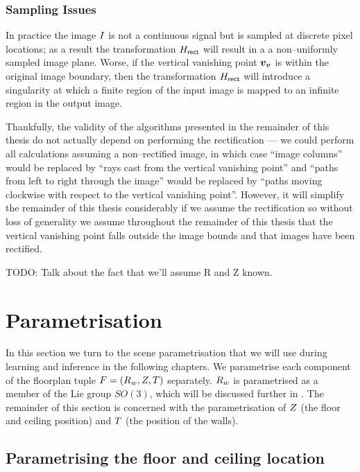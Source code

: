 \subsubsection{Sampling Issues}

In practice the image $\Image$ is not a continuous signal but is
sampled at discrete pixel locations; as a result the transformation
$\Rectifier$ will result in a a non--uniformly sampled image
plane. Worse, if the vertical vanishing point $\vvpt$ is within the
original image boundary, then the transformation $\Rectifier$ will
introduce a singularity at which a finite region of the input image is
mapped to an infinite region in the output image.

Thankfully, the validity of the algorithms presented in the remainder
of this thesis do not actually depend on performing the rectification
 --- we could perform all calculations assuming
a non--rectified image, in which case ``image columns'' would be
replaced by ``rays cast from the vertical vanishing point'' and
``paths from left to right through the image'' would be replaced by
``paths moving clockwise with respect to the vertical vanishing
point''. However, it will simplify the remainder of this thesis
considerably if we assume the rectification  so
without loss of generality we assume throughout the remainder of this
thesis that the vertical vanishing point falls outside the image
bounds and that images have been rectified.

TODO: Talk about the fact that we'll assume R and Z known.

\section{Parametrisation}

In this section we turn to the scene parametrisation that we will use
during learning and inference in the following chapters. We
parametrise each component of the floorplan tuple
$\Floorplan=(\SceneR,\Zs,\Polyline)$ separately. $\SceneR$ is
parametrised as a member of the Lie group $SO(3)$, which will be
discussed further in . The remainder of this
section is concerned with the parametrisation of $\Zs$ (the floor and
ceiling position) and $\Polyline$ (the position of the walls).

\subsection{Parametrising the floor and ceiling location}

